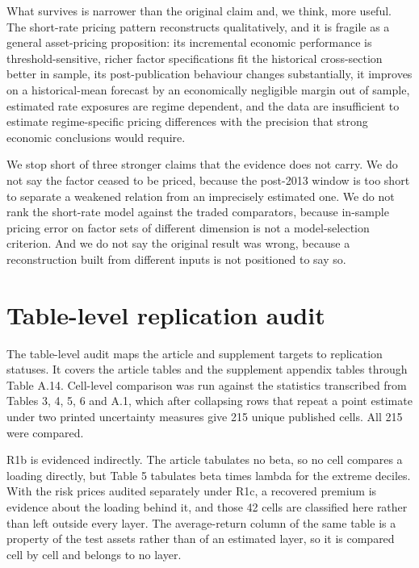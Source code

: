 \documentclass[11pt]{article}
\begin{document}
What survives is narrower than the original claim and, we think, more useful.
The short-rate pricing pattern reconstructs qualitatively, and it is fragile as
a general asset-pricing proposition: its incremental economic performance is
threshold-sensitive, richer factor specifications fit the historical
cross-section better in sample, its post-publication behaviour changes
substantially, it improves on a historical-mean forecast by an economically
negligible margin out of sample, estimated rate exposures are regime dependent,
and the data are insufficient to estimate regime-specific pricing differences
with the precision that strong economic conclusions would require.

We stop short of three stronger claims that the evidence does not carry. We do
not say the factor ceased to be priced, because the post-2013 window is too %
short to separate a weakened relation from an imprecisely estimated one. We do
not rank the short-rate model against the traded comparators, because in-sample
pricing error on factor sets of different dimension is not a model-selection
criterion. And we do not say the original result was wrong, because a
reconstruction built from different inputs is not positioned to say so.

\appendix

\section{Table-level replication audit}
\label{sec:audit}

The table-level audit maps the article and supplement targets to replication
statuses. It covers the article tables and the supplement appendix tables through
Table A.14. %
Cell-level comparison was run against the statistics transcribed from Tables 3, %
4, 5, 6 and A.1, which after collapsing rows that repeat a point estimate under %
two printed uncertainty measures give 215 unique published cells. All 215 were %
compared. %





R1b is evidenced indirectly. The article tabulates no beta, so no cell compares
a loading directly, but Table 5 tabulates beta times lambda for the extreme %
deciles. With the risk prices audited separately under R1c, a recovered premium
is evidence about the loading behind it, and those 42 cells are classified here %
rather than left outside every layer. The average-return column of the same
table is a property of the test assets rather than of an estimated layer, so it
is compared cell by cell and belongs to no layer.
\end{document}
